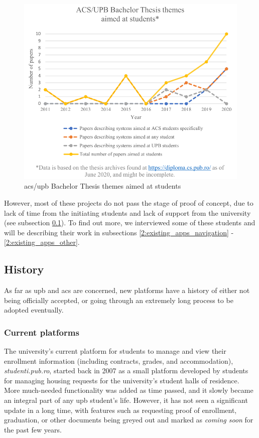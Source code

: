     \begin{figure}[ht]
        \centering
             \includegraphics[height=0.45\textheight]{figures/charts/papers_aimed_at_students.pdf}
        \caption{\acrshort{acs}/\acrshort{upb} Bachelor Thesis themes aimed at students}
        \label{2:fig:papers_aimed_at_students}
    \end{figure}
    
    However, most of these projects do not pass the stage of proof of concept, due to lack of time from the initiating students and lack of support from the university (see subsection \ref{2:existing_apps_history}). To find out more, we interviewed some of these students and will be describing their work in subsections \ref{2:existing_apps_navigation} - \ref{2:existing_apps_other}.
    
    \subsection{History} \label{2:existing_apps_history}
    As far as \acrshort{upb} and \acrshort{acs} are concerned, new platforms have a history of either not being officially accepted, or going through an extremely long process to be adopted eventually.
    
    \subsubsection{Current platforms} \label{2:existing_apps_history_current}
    The university's current platform for students to manage and view their enrollment information (including contracts, grades, and accommodation),  \textit{studenti.pub.ro}, started back in 2007 as a small platform developed by students for managing housing requests for the university's student halls of residence. More much-needed functionality was added as time passed, and it slowly became an integral part of any \acrshort{upb} student's life. However, it has not seen a significant update in a long time, with features such as requesting proof of enrollment, graduation, or other documents being greyed out and marked as \textit{coming soon} for the past few years.
    
